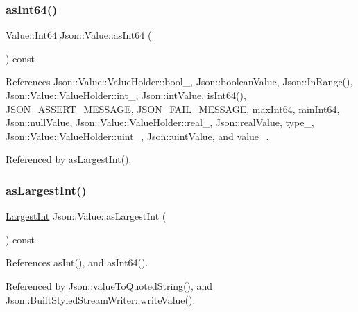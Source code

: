 \subsubsection{\texorpdfstring{as\+Int64()}{asInt64()}}
{\footnotesize\ttfamily \hyperlink{classJson_1_1Value_a1b86af9f85f0f1baa972c3319fa22695_a1b86af9f85f0f1baa972c3319fa22695}{Value\+::\+Int64} Json\+::\+Value\+::as\+Int64 (\begin{DoxyParamCaption}{ }\end{DoxyParamCaption}) const}



References Json\+::\+Value\+::\+Value\+Holder\+::bool\+\_\+, Json\+::boolean\+Value, Json\+::\+In\+Range(), Json\+::\+Value\+::\+Value\+Holder\+::int\+\_\+, Json\+::int\+Value, is\+Int64(), J\+S\+O\+N\+\_\+\+A\+S\+S\+E\+R\+T\+\_\+\+M\+E\+S\+S\+A\+GE, J\+S\+O\+N\+\_\+\+F\+A\+I\+L\+\_\+\+M\+E\+S\+S\+A\+GE, max\+Int64, min\+Int64, Json\+::null\+Value, Json\+::\+Value\+::\+Value\+Holder\+::real\+\_\+, Json\+::real\+Value, type\+\_\+, Json\+::\+Value\+::\+Value\+Holder\+::uint\+\_\+, Json\+::uint\+Value, and value\+\_\+.



Referenced by as\+Largest\+Int().

\mbox{\label{classJson_1_1Value_ab16f2ea2a117a1b3b576acab8b6a700d_ab16f2ea2a117a1b3b576acab8b6a700d}} 
\subsubsection{\texorpdfstring{as\+Largest\+Int()}{asLargestInt()}}
{\footnotesize\ttfamily \hyperlink{classJson_1_1Value_a1cbb82642ed05109b9833e49f042ece7_a1cbb82642ed05109b9833e49f042ece7}{Largest\+Int} Json\+::\+Value\+::as\+Largest\+Int (\begin{DoxyParamCaption}{ }\end{DoxyParamCaption}) const}



References as\+Int(), and as\+Int64().



Referenced by Json\+::value\+To\+Quoted\+String(), and Json\+::\+Built\+Styled\+Stream\+Writer\+::write\+Value().

\mbox{\label{classJson_1_1Value_ad03548101e0bf3d2d9eac75c64a0b8d7_ad03548101e0bf3d2d9eac75c64a0b8d7}} 
